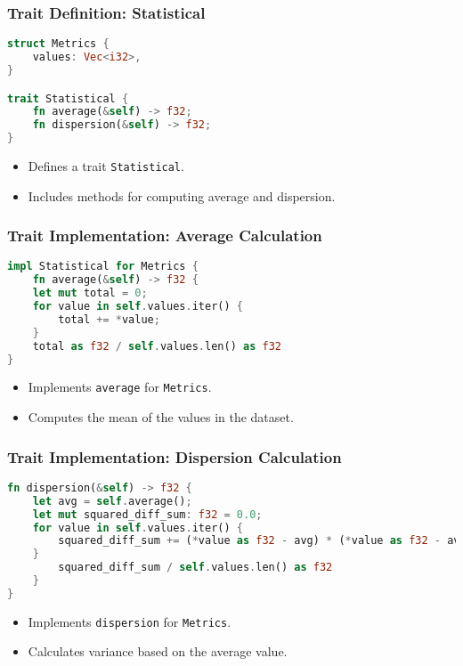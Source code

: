 \documentclass[aspectratio=169, table]{beamer}
\begin{document}
\begin{frame}[fragile]
\frametitle{Trait Definition: Statistical}
\begin{lstlisting}[language=Rust]
struct Metrics {
	values: Vec<i32>,
}

trait Statistical {
	fn average(&self) -> f32; 
	fn dispersion(&self) -> f32;  
}
\end{lstlisting}
\begin{itemize}
\item Defines a trait \texttt{Statistical}.
\item Includes methods for computing average and dispersion.
\end{itemize}
\end{frame}

\begin{frame}[fragile]
\frametitle{Trait Implementation: Average Calculation}
\begin{lstlisting}[language=Rust]
impl Statistical for Metrics {
	fn average(&self) -> f32 {
	let mut total = 0; 
	for value in self.values.iter() {
		total += *value; 
	}
	total as f32 / self.values.len() as f32
}
\end{lstlisting}
\begin{itemize}
\item Implements \texttt{average} for \texttt{Metrics}.
\item Computes the mean of the values in the dataset.
\end{itemize}
\end{frame}

\begin{frame}[fragile]
\frametitle{Trait Implementation: Dispersion Calculation}
\vspace{20pt}
\begin{lstlisting}[language=Rust]
fn dispersion(&self) -> f32 {
	let avg = self.average();  
	let mut squared_diff_sum: f32 = 0.0;
	for value in self.values.iter() {
		squared_diff_sum += (*value as f32 - avg) * (*value as f32 - avg);
	} 
		squared_diff_sum / self.values.len() as f32
	}
}
\end{lstlisting}
\begin{itemize}
\item Implements \texttt{dispersion} for \texttt{Metrics}.
\item Calculates variance based on the average value.
\end{itemize}
\end{frame}
\end{document}
